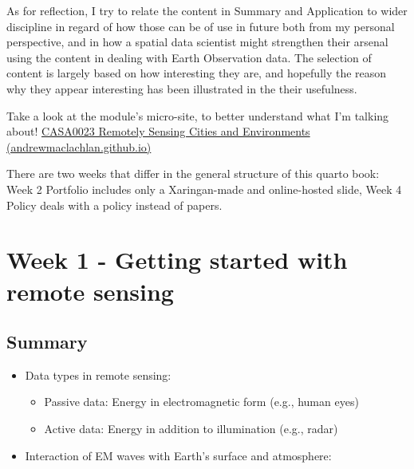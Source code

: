 \documentclass[
  letterpaper,
  DIV=11,
  numbers=noendperiod]{scrreprt}
\providecommand{\tightlist}{%
  \setlength{\itemsep}{0pt}\setlength{\parskip}{0pt}}\usepackage{longtable,booktabs,array}
\begin{document}
As for reflection, I try to relate the content in Summary and
Application to wider discipline in regard of how those can be of use in
future both from my personal perspective, and in how a spatial data
scientist might strengthen their arsenal using the content in dealing
with Earth Observation data. The selection of content is largely based
on how interesting they are, and hopefully the reason why they appear
interesting has been illustrated in the their usefulness.

Take a look at the module's micro-site, to better understand what I'm
talking about!
\href{https://andrewmaclachlan.github.io/CASA0023/}{CASA0023 Remotely
Sensing Cities and Environments (andrewmaclachlan.github.io)}

There are two weeks that differ in the general structure of this quarto
book: Week 2 Portfolio includes only a Xaringan-made and online-hosted
slide, Week 4 Policy deals with a policy instead of papers.


\hypertarget{week-1---getting-started-with-remote-sensing}{%
\chapter{Week 1 - Getting started with remote
sensing}\label{week-1---getting-started-with-remote-sensing}}

\hypertarget{summary}{%
\section{Summary}\label{summary}}

\begin{itemize}
\tightlist
\item
  Data types in remote sensing:

  \begin{itemize}
  \tightlist
  \item
    Passive data: Energy in electromagnetic form (e.g., human eyes)
  \item
    Active data: Energy in addition to illumination (e.g., radar)
  \end{itemize}
\item
  Interaction of EM waves with Earth's surface and atmosphere:
\end{itemize}
\end{document}
